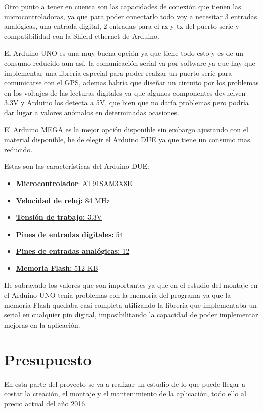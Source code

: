Otro punto a tener en cuenta son las capacidades de conexión que tienen las microcontroladoras, ya que para poder conectarlo todo voy a necesitar 3 entradas analógicas, una  entrada digital, 2 entradas para el rx y tx del puerto serie y compatibilidad con la Shield ethernet de Arduino.

El Arduino UNO es una muy buena opción ya que tiene todo esto y es de un consumo reducido aun así, la comunicación serial va por software ya que hay que implementar una librería especial para poder realzar un puerto serie para comunicarse con el GPS, ademas habría que diseñar un circuito por los problemas en los voltajes de las lecturas digitales ya que algunos componentes devuelven 3.3V y Arduino los detecta a 5V, que bien que no daría problemas pero podría dar lugar a valores anómalos en determinadas ocasiones.

El Arduino MEGA es la mejor opción disponible sin embargo ajustando con el material disponible, he de elegir el Arduino DUE ya que tiene un consumo mas reducido.

Estas son las características del Arduino DUE:

\begin{itemize}
\item \textbf{Microcontrolador}: AT91SAM3X8E
\item \textbf{Velocidad de reloj:} 84 MHz
\item \underline{\textbf{Tensión de trabajo:} 3.3V}
\item \underline{\textbf{Pines de entradas digitales:} 54}
\item \underline{\textbf{Pines de entradas analógicas: }12}
\item \underline{\textbf{Memoria Flash:} 512 KB}
\end{itemize}

He subrayado los valores que son importantes ya que en el estudio del montaje en el Arduino UNO tenia problemas con la memoria del programa ya que la memoria Flash quedaba casi completa utilizando la librería que implementaba un serial en cualquier pin digital,  imposibilitando la capacidad de poder implementar mejoras en la aplicación.

\section{Presupuesto}

En esta parte del proyecto se va a realizar un estudio de lo que puede llegar a costar la creación, el montaje y el mantenimiento de la aplicación, todo ello al precio actual del año 2016.

